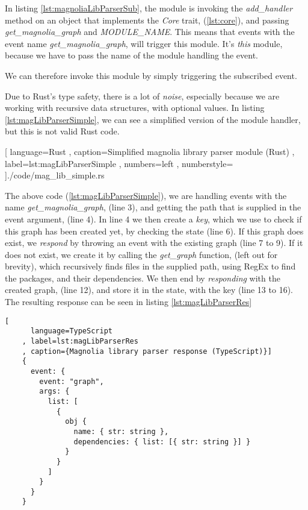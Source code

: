 In listing \ref{lst:magnoliaLibParserSub}, the module is invoking the
\textit{add\_handler} method on an object that implements the \textit{Core} trait,
(\ref{lst:core}), and passing \textit{get\_magnolia\_graph} and
\textit{MODULE\_NAME}. This means that events with the event name
\textit{get\_magnolia\_graph}, will trigger this module. It's \textit{this}
module, because we have to pass the name of the module handling the event.

We can therefore invoke this module by simply triggering the subscribed event.

Due to Rust's type safety, there is a lot of \textit{noise}, especially because
we are working with recursive data structures, with optional values. In listing
\ref{lst:magLibParserSimple}, we can see a simplified version of the module
handler, but this is not valid Rust code.

\begin{code}[H]
  
    [ language=Rust
    , caption={Simplified magnolia library parser module (Rust)}
    , label=lst:magLibParserSimple
    , numbers=left
    , numberstyle=\tiny\color{gray}
    ]{./code/mag\_lib\_simple.rs}
\end{code}

The above code (\ref{lst:magLibParserSimple}), we are handling events with the name
\textit{get\_magnolia\_graph}, (line 3), and getting the path that is supplied in
the event argument, (line 4). In line 4 we then create a \textit{key}, which we
use to check if this graph has been created yet, by checking the state (line 6).
If this graph does exist, we \textit{respond} by throwing an event with the
existing graph (line 7 to 9). If it does not exist, we create it by calling the
\textit{get\_graph} function, (left out for brevity), which recursively finds
files in the supplied path, using RegEx to find the packages, and their
dependencies. We then end by \textit{responding} with the created graph,
(line 12), and store it in the state, with the key (line 13 to 16). The
resulting response can be seen in listing \ref{lst:magLibParserRes}

\begin{code}[H]
  \begin{lstlisting}[
      language=TypeScript
    , label=lst:magLibParserRes
    , caption={Magnolia library parser response (TypeScript)}]
    {
      event: {
        event: "graph",
        args: {
          list: [
            {
              obj {
                name: { str: string },
                dependencies: { list: [{ str: string }] }
              }
            }
          ]
        }
      }
    }
  \end{lstlisting}
\end{code}

